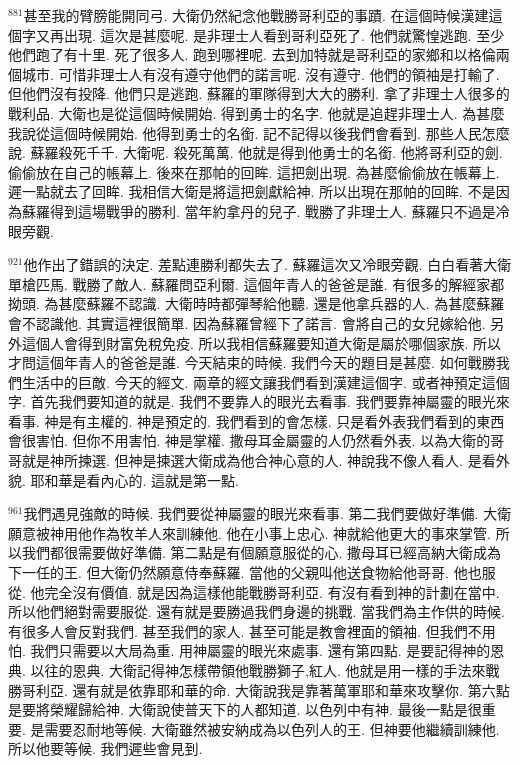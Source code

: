 \documentclass{book}
\begin{document}
$^{881}$甚至我的臂膀能開同弓.
大衛仍然紀念他戰勝哥利亞的事蹟.
在這個時候漢建這個字又再出現.
這次是甚麼呢.
是非理士人看到哥利亞死了.
他們就驚惶逃跑.
至少他們跑了有十里.
死了很多人.
跑到哪裡呢.
去到加特就是哥利亞的家鄉和以格倫兩個城市.
可惜非理士人有沒有遵守他們的諾言呢.
沒有遵守.
他們的領袖是打輸了.
但他們沒有投降.
他們只是逃跑.
蘇羅的軍隊得到大大的勝利.
拿了非理士人很多的戰利品.
大衛也是從這個時候開始.
得到勇士的名字.
他就是追趕非理士人.
為甚麼我說從這個時候開始.
他得到勇士的名銜.
記不記得以後我們會看到.
那些人民怎麼說.
蘇羅殺死千千.
大衛呢.
殺死萬萬.
他就是得到他勇士的名銜.
他將哥利亞的劍.
偷偷放在自己的帳幕上.
後來在那帕的回眸.
這把劍出現.
為甚麼偷偷放在帳幕上.
遲一點就去了回眸.
我相信大衛是將這把劍獻給神.
所以出現在那帕的回眸.
不是因為蘇羅得到這場戰爭的勝利.
當年約拿丹的兒子.
戰勝了非理士人.
蘇羅只不過是冷眼旁觀.

$^{921}$他作出了錯誤的決定.
差點連勝利都失去了.
蘇羅這次又冷眼旁觀.
白白看著大衛單槍匹馬.
戰勝了敵人.
蘇羅問亞利爾.
這個年青人的爸爸是誰.
有很多的解經家都拗頭.
為甚麼蘇羅不認識.
大衛時時都彈琴給他聽.
還是他拿兵器的人.
為甚麼蘇羅會不認識他.
其實這裡很簡單.
因為蘇羅曾經下了諾言.
會將自己的女兒嫁給他.
另外這個人會得到財富免稅免疫.
所以我相信蘇羅要知道大衛是屬於哪個家族.
所以才問這個年青人的爸爸是誰.
今天結束的時候.
我們今天的題目是甚麼.
如何戰勝我們生活中的巨敵.
今天的經文.
兩章的經文讓我們看到漢建這個字.
或者神預定這個字.
首先我們要知道的就是.
我們不要靠人的眼光去看事.
我們要靠神屬靈的眼光來看事.
神是有主權的.
神是預定的.
我們看到的會怎樣.
只是看外表我們看到的東西會很害怕.
但你不用害怕.
神是掌權.
撒母耳金屬靈的人仍然看外表.
以為大衛的哥哥就是神所揀選.
但神是揀選大衛成為他合神心意的人.
神說我不像人看人.
是看外貌.
耶和華是看內心的.
這就是第一點.

$^{961}$我們遇見強敵的時候.
我們要從神屬靈的眼光來看事.
第二我們要做好準備.
大衛願意被神用他作為牧羊人來訓練他.
他在小事上忠心.
神就給他更大的事來掌管.
所以我們都很需要做好準備.
第二點是有個願意服從的心.
撒母耳已經高納大衛成為下一任的王.
但大衛仍然願意侍奉蘇羅.
當他的父親叫他送食物給他哥哥.
他也服從.
他完全沒有價值.
就是因為這樣他能戰勝哥利亞.
有沒有看到神的計劃在當中.
所以他們絕對需要服從.
還有就是要勝過我們身邊的挑戰.
當我們為主作供的時候.
有很多人會反對我們.
甚至我們的家人.
甚至可能是教會裡面的領袖.
但我們不用怕.
我們只需要以大局為重.
用神屬靈的眼光來處事.
還有第四點.
是要記得神的恩典.
以往的恩典.
大衛記得神怎樣帶領他戰勝獅子,紅人.
他就是用一樣的手法來戰勝哥利亞.
還有就是依靠耶和華的命.
大衛說我是靠著萬軍耶和華來攻擊你.
第六點是要將榮耀歸給神.
大衛說使普天下的人都知道.
以色列中有神.
最後一點是很重要.
是需要忍耐地等候.
大衛雖然被安納成為以色列人的王.
但神要他繼續訓練他.
所以他要等候.
我們遲些會見到.
\end{document}
